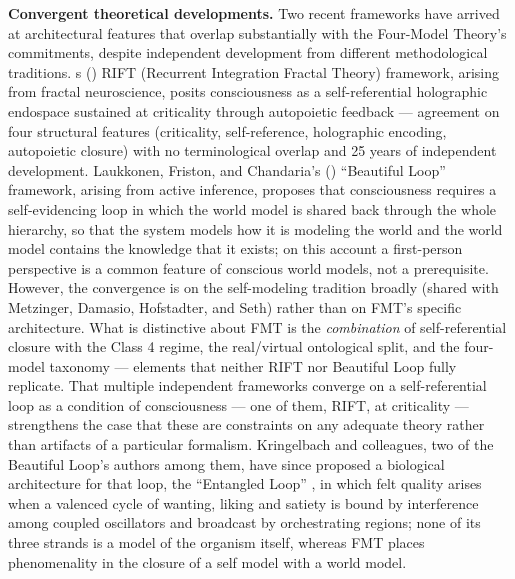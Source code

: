 \documentclass[12pt]{article}
\newcommand{\revstart}{}
\newcommand{\revend}{}
\begin{document}
{\revstart\textbf{Convergent theoretical developments.} Two recent frameworks have arrived at architectural features that overlap substantially with the Four-Model Theory's commitments, despite independent development from different methodological traditions. \citeauthor{Bieberich2026}\textquotesingle s (\citeyear{Bieberich2026}) RIFT (Recurrent Integration Fractal Theory) framework, arising from fractal neuroscience, posits consciousness as a self-referential holographic endospace sustained at criticality through autopoietic feedback --- agreement on four structural features (criticality, self-reference, holographic encoding, autopoietic closure) with no terminological overlap and 25 years of independent development. Laukkonen, Friston, and Chandaria's (\citeyear{Laukkonen2025}) ``Beautiful Loop'' framework, arising from active inference, proposes that consciousness requires a self-evidencing loop in which the world model is shared back through the whole hierarchy, so that the system models how it is modeling the world and the world model contains the knowledge that it exists; on this account a first-person perspective is a common feature of conscious world models, not a prerequisite. However, the convergence is on the self-modeling tradition broadly (shared with Metzinger, Damasio, Hofstadter, and Seth) rather than on FMT's specific architecture. What is distinctive about FMT is the \emph{combination} of self-referential closure with the Class 4 regime, the real/virtual ontological split, and the four-model taxonomy --- elements that neither RIFT nor Beautiful Loop fully replicate. That multiple independent frameworks converge on a self-referential loop as a condition of consciousness --- one of them, RIFT, at criticality --- strengthens the case that these are constraints on any adequate theory rather than artifacts of a particular formalism. Kringelbach and colleagues, two of the Beautiful Loop's authors among them, have since proposed a biological architecture for that loop, the ``Entangled Loop'' \citep{Kringelbach2027}, in which felt quality arises when a valenced cycle of wanting, liking and satiety is bound by interference among coupled oscillators and broadcast by orchestrating regions; none of its three strands is a model of the organism itself, whereas FMT places phenomenality in the closure of a self model with a world model.\revend}
\end{document}
